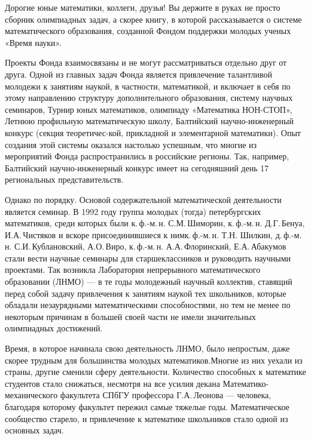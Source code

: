 \def\abz{\hspace{0.9cm}}

\ms\abz Дорогие юные математики, коллеги, друзья! Вы держите в руках не просто сборник олимпиадных задач, а скорее книгу, в которой рассказывается о системе математического образования, созданной Фондом поддержки молодых ученых «Время науки».

\ms\abz Проекты Фонда взаимосвязаны и не могут рассматриваться отдельно друг от друга. Одной из главных задач Фонда является привлечение талантливой молодежи к занятиям наукой, в частности, математикой, и включает в себя по этому направлению  структуру дополнительного образования, систему научных семинаров, Турнир юных математиков, олимпиаду «Математика НОН-СТОП», Летнюю профильную математическую школу, Балтийский научно-инженерный конкурс (секция теоретичес-\linebreak кой, прикладной и элементарной математики). Опыт создания этой системы оказался настолько успешным, что многие из мероприятий Фонда распространились в российские регионы. Так, например, Балтийский научно-инженерный конкурс имеет на сегодняшний день 17 региональных представительств.

\ms\abz Однако по порядку. Основой содержательной математической деятельности является семинар. В 1992 году группа  молодых (тогда) петербургских математиков, среди которых были к.\,ф.-м.\,н. С.М.\,Шиморин, к.\,ф.-м.\,н. Д.Г.\,Бенуа, И.А.\,Чистяков и вскоре присоединившиеся к ним\linebreak к.\,ф.-м.\,н. Т.Н. Шилкин, д.\,ф.-м.\,н. С.И.\,Кублановский, А.О.\,Виро, к.\,ф.-м.\,н. А.А.\,Флоринский, Е.А.\,Абакумов стали вести научные семинары для старшеклассников и руководить научными проектами. Так возникла Лаборатория непрерывного математического образовании (ЛНМО) — в те годы молодежный научный коллектив, ставящий перед собой задачу привлечения к занятиям наукой тех школьников, которые обладали незаурядными математическими способностями, но тем не менее по некоторым причинам в большей своей части не имели значительных олимпиадных достижений.

\ms\abz Время, в которое начинала свою деятельность ЛНМО, было непростым, даже скорее трудным для большинства молодых математиков.\linebreak Многие из них уехали из страны, другие сменили сферу деятельности. Количество способных к математике студентов стало снижаться, несмотря на все усилия декана Математико-механического факультета СПбГУ профессора Г.А.\,Леонова — человека, благодаря которому факультет пережил самые тяжелые годы. Математическое сообщество старело, и привлечение к математике школьников стало одной из основных задач.

